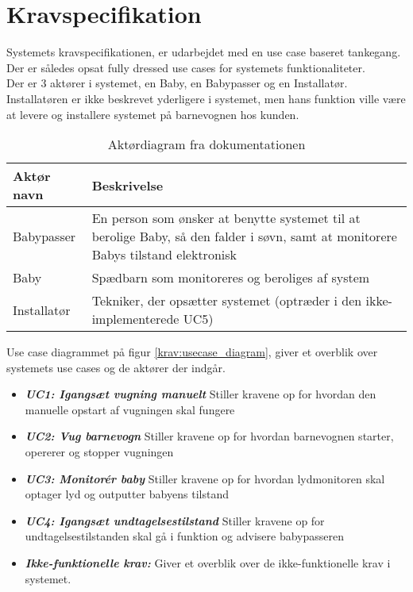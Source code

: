 \chapter{Kravspecifikation}

Systemets kravspecifikationen, er udarbejdet med en use case baseret tankegang. Der er således opsat fully dressed use cases for systemets funktionaliteter. \\
Der er 3 aktører i systemet, en Baby, en Babypasser og en Installatør. Installatøren er ikke beskrevet yderligere i systemet, men hans funktion ville være at levere og installere systemet på barnevognen hos kunden.

\begin{table}[!htbp] \centering
	\caption{Aktørdiagram fra dokumentationen}
	\label{krav:aktoerdiagram}
	\begin{tabular}{|p{2.5cm}|p{11.5cm}|}
	\hline
		\textbf{Aktør navn} & \textbf{Beskrivelse} \\\hline
		Babypasser 
		& En person som ønsker at benytte systemet til at 
		  berolige Baby, så den falder i søvn, samt at monitorere Babys tilstand elektronisk
		\\\hline
		Baby 
		& Spædbarn som monitoreres og beroliges af system
		\\\hline
		Installatør
		& Tekniker, der opsætter systemet (optræder i den ikke-implementerede UC5)
		\\\hline
	\end{tabular}
\end{table}

Use case diagrammet på figur \ref{krav:usecase_diagram}, giver et overblik over systemets use cases og de aktører der indgår.


\begin{itemize}
\item \textbf{\textit{UC1: Igangsæt vugning manuelt}} Stiller kravene op for hvordan den manuelle opstart af vugningen skal fungere
\item \textbf{\textit{UC2: Vug barnevogn}} Stiller kravene op for hvordan barnevognen starter, opererer og stopper vugningen
\item \textbf{\textit{UC3: Monitorér baby}} Stiller kravene op for hvordan lydmonitoren skal optager lyd og outputter babyens tilstand
\item \textbf{\textit{UC4: Igangsæt undtagelsestilstand}} Stiller kravene op for undtagelsestilstanden skal gå i funktion og advisere babypasseren
\item \textbf{\textit{Ikke-funktionelle krav:}} Giver et overblik over de ikke-funktionelle krav i systemet. 
\end{itemize}

